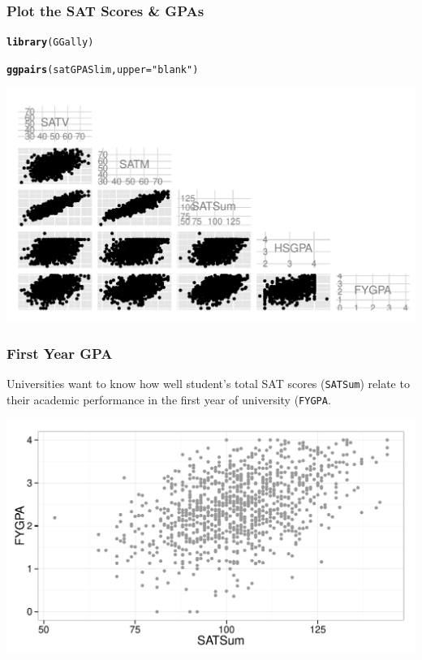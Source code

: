 \documentclass{beamer}\usepackage{graphicx, color}
\makeatletter
\def\maxwidth{ %
  \ifdim\Gin@nat@width>\linewidth
    \linewidth
  \else
    \Gin@nat@width
  \fi
}
\newcommand{\hlfunctioncall}[1]{\textcolor[rgb]{0.501960784313725,0,0.329411764705882}{\textbf{#1}}}%
\newcommand{\hlstring}[1]{\textcolor[rgb]{0.6,0.6,1}{#1}}%
\newenvironment{kframe}{%
 \def\at@end@of@kframe{}%
 \ifinner\ifhmode%
  \def\at@end@of@kframe{\end{minipage}}%
  \begin{minipage}{\columnwidth}%
 \fi\fi%
 \def\FrameCommand##1{\hskip\@totalleftmargin \hskip-\fboxsep
 \colorbox{shadecolor}{##1}\hskip-\fboxsep
     \hskip-\linewidth \hskip-\@totalleftmargin \hskip\columnwidth}%
 \MakeFramed {\advance\hsize-\width
   \@totalleftmargin\z@ \linewidth\hsize
   \@setminipage}}%
 {\par\unskip\endMakeFramed%
 \at@end@of@kframe}
\newenvironment{knitrout}{}{} %
\makeatother
\begin{document}
\begin{frame}[fragile]
  \frametitle{Plot the SAT Scores \& GPAs}
\begin{knitrout}
\color{fgcolor}\begin{kframe}
\begin{alltt}
\hlfunctioncall{library}(GGally)

\hlfunctioncall{ggpairs}(satGPASlim, upper = \hlstring{"blank"})
\end{alltt}
\end{kframe}

{\centering \includegraphics[width=\maxwidth]{figure/DescribeGPA} 

}


\end{knitrout}

\end{frame}

\begin{frame}[fragile]
  \frametitle{First Year GPA}
  Universities want to know how well student's total SAT scores (\texttt{SATSum}) relate to their academic performance in the first year of university (\texttt{FYGPA}.
\begin{knitrout}
\color{fgcolor}

{\centering \includegraphics[width=\maxwidth]{figure/SATFYGPA} 

}


\end{knitrout}

\end{frame}
\end{document}
